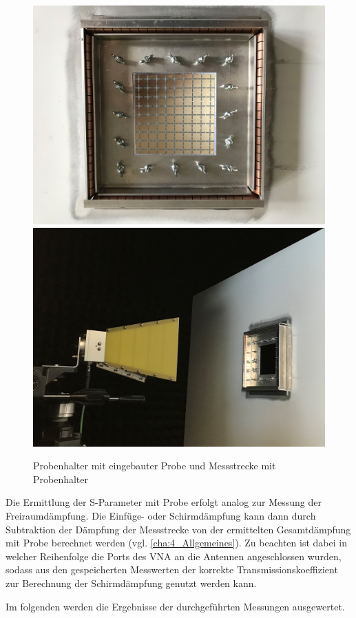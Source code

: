 \begin{figure}[ht]
    \centering
    \includegraphics[height=.2\textheight, draft = false]{Abbildungen/Kapitel4/Probenhalter.jpg}
    \hspace{1cm}
    \includegraphics[height=.2\textheight, draft = false]{Abbildungen/Kapitel4/IMG_5675_trimmed.jpg}
    \caption{Probenhalter mit eingebauter Probe und Messstrecke mit Probenhalter}
    \label{fig:4_Probenhalter_mit_Probe}
\end{figure}


Die Ermittlung der S-Parameter mit Probe erfolgt analog zur Messung der Freiraumdämpfung. Die Einfüge- oder Schirmdämpfung kann dann durch Subtraktion der Dämpfung der Messstrecke von der ermittelten Gesamtdämpfung mit Probe berechnet werden (vgl. \Abschnitt\ref{cha:4_Allgemeines}). Zu beachten ist dabei in welcher Reihenfolge die Ports des VNA an die Antennen angeschlossen wurden, sodass aus den gespeicherten Messwerten der korrekte Transmissionskoeffizient zur Berechnung der Schirmdämpfung genutzt werden kann.
\par
\vspace{\linespace}
Im folgenden \Abschnitt werden die Ergebnisse der durchgeführten Messungen ausgewertet.














